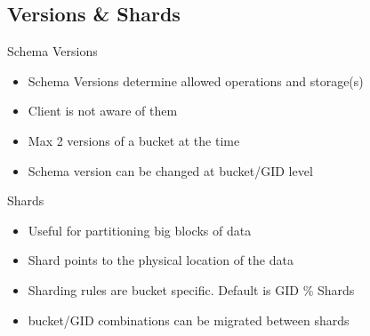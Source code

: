 \documentclass[aspectratio=169]{beamer}
\begin{document}
\subsection{Versions \& Shards}

\begin{frame}{Schema Versions}
    \begin{itemize}
        \item Schema Versions determine allowed operations and storage(s)
        \item Client is not aware of them
        \item Max 2 versions of a bucket at the time
        \item Schema version can be changed at bucket/GID level
    \end{itemize}
\end{frame}

\begin{frame}{Shards}
    \begin{itemize}
        \item Useful for partitioning big blocks of data
        \item Shard points to the physical location of the data
        \item Sharding rules are bucket specific. Default is GID \% Shards
        \item bucket/GID combinations can be migrated between shards
    \end{itemize}
\end{frame}
\end{document}
